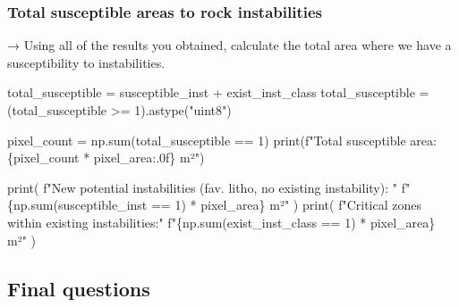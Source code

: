 \documentclass[
  letterpaper,
  DIV=11,
  numbers=noendperiod]{scrartcl}
\newenvironment{Shaded}{\begin{snugshade}}{\end{snugshade}}
\newcommand{\BuiltInTok}[1]{\textcolor[rgb]{0.00,0.23,0.31}{#1}}
\newcommand{\DecValTok}[1]{\textcolor[rgb]{0.68,0.00,0.00}{#1}}
\newcommand{\NormalTok}[1]{\textcolor[rgb]{0.00,0.23,0.31}{#1}}
\newcommand{\OperatorTok}[1]{\textcolor[rgb]{0.37,0.37,0.37}{#1}}
\newcommand{\SpecialCharTok}[1]{\textcolor[rgb]{0.37,0.37,0.37}{#1}}
\newcommand{\SpecialStringTok}[1]{\textcolor[rgb]{0.13,0.47,0.30}{#1}}
\newcommand{\StringTok}[1]{\textcolor[rgb]{0.13,0.47,0.30}{#1}}
\begin{document}
\subsubsection{Total susceptible areas to rock
instabilities}\label{total-susceptible-areas-to-rock-instabilities}

→ Using all of the results you obtained, calculate the total area where
we have a susceptibility to instabilities.

\begin{Shaded}
\begin{Highlighting}[]
\NormalTok{total\_susceptible }\OperatorTok{=}\NormalTok{ susceptible\_inst }\OperatorTok{+}\NormalTok{ exist\_inst\_class}
\NormalTok{total\_susceptible }\OperatorTok{=}\NormalTok{ (total\_susceptible }\OperatorTok{\textgreater{}=} \DecValTok{1}\NormalTok{).astype(}\StringTok{"uint8"}\NormalTok{)}

\NormalTok{pixel\_count }\OperatorTok{=}\NormalTok{ np.}\BuiltInTok{sum}\NormalTok{(total\_susceptible }\OperatorTok{==} \DecValTok{1}\NormalTok{)}
\BuiltInTok{print}\NormalTok{(}\SpecialStringTok{f"Total susceptible area: }\SpecialCharTok{\{}\NormalTok{pixel\_count }\OperatorTok{*}\NormalTok{ pixel\_area}\SpecialCharTok{:.0f\}}\SpecialStringTok{ m²"}\NormalTok{)}


\BuiltInTok{print}\NormalTok{(}
    \SpecialStringTok{f"New potential instabilities (fav. litho, no existing instability): "}
    \SpecialStringTok{f"}\SpecialCharTok{\{}\NormalTok{np}\SpecialCharTok{.}\BuiltInTok{sum}\NormalTok{(susceptible\_inst }\OperatorTok{==} \DecValTok{1}\NormalTok{) }\OperatorTok{*}\NormalTok{ pixel\_area}\SpecialCharTok{\}}\SpecialStringTok{ m²"}
\NormalTok{)}
\BuiltInTok{print}\NormalTok{(}
    \SpecialStringTok{f"Critical zones within existing instabilities:"}
    \SpecialStringTok{f"}\SpecialCharTok{\{}\NormalTok{np}\SpecialCharTok{.}\BuiltInTok{sum}\NormalTok{(exist\_inst\_class }\OperatorTok{==} \DecValTok{1}\NormalTok{) }\OperatorTok{*}\NormalTok{ pixel\_area}\SpecialCharTok{\}}\SpecialStringTok{ m²"}
\NormalTok{)}
\end{Highlighting}
\end{Shaded}

\subsection{Final questions}\label{final-questions}
\end{document}
